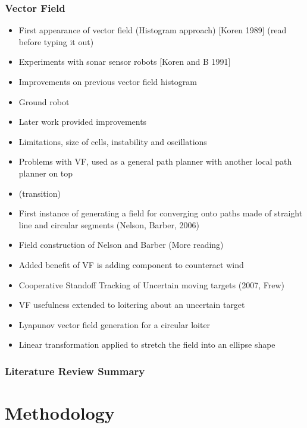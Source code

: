 \documentclass[numbered,pdftex]{ohio-etd}
\begin{document}
\subsection{Vector Field}
\begin{itemize}
\item First appearance of vector field (Histogram approach) [Koren 1989] (read before typing it out)

\item Experiments with sonar sensor robots [Koren and B 1991]

\item \citep{borenstein_real-time_1990} Improvements on previous vector field histogram
\item Ground robot
\item Later work provided improvements
\item Limitations, size of cells, instability and oscillations
\item Problems with VF, used as a general path planner with another local path planner on top 
\item (transition)


\item First instance of generating a field for converging onto paths made of straight line and circular segments (Nelson, Barber, 2006)
\item Field construction of Nelson and Barber (More reading)
\item Added benefit of VF is adding component to counteract wind

\item Cooperative Standoff Tracking of Uncertain moving targets (2007, Frew)
\item VF usefulness extended to loitering about an uncertain target
\item Lyapunov vector field generation for a circular loiter
\item Linear transformation applied to stretch the field into an ellipse shape
\end{itemize}

\subsection{Literature Review Summary}


\chapter{Methodology}

\end{document}

